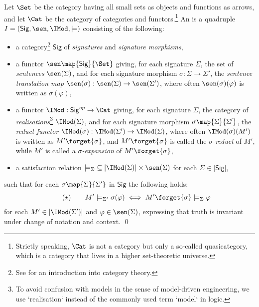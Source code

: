 \documentclass[10pt, a4paper]{isov2}
\newcommand{\Sig}{\mathsf{Sig}}
\begin{document}
\begin{definition}\label{def:inst}  Let $\Set$ be the
category having all small \textsc{}sets as objects and functions as
arrows, and let $\Cat$ be the category
of categories and functors.\footnote {Strictly speaking, $\Cat$ is not a
category but only a so-called quasicategory, which is a category that
lives in a higher set-theoretic universe.}
An
 \cite{GoguenBurstall92} is a quadruple $I=(\Sig,\sen,\IMod,{\models})$
consisting of the following:
%
\begin{itemize}
\item a category\footnote{See \cite{AHS}\cite{MacLane} for an introduction into category theory.} $\Sig$ of \emph{signatures} and \emph{signature morphisms},
\item a functor $\sen\map{\Sig}{\Set}$  giving, for each signature $\Sigma$, the set of
\emph{sentences} $\sen(\Sigma)$, and for each signature morphism
$\sigma:{\Sigma}\to{\Sigma'}$, the \emph{sentence translation map}
$\sen(\sigma):{\sen(\Sigma)}\to{\sen(\Sigma')}$, where often
$\sen(\sigma)(\varphi)$ is written as $\sigma(\varphi)$, \item a
functor $\IMod:{\Sig^{op}}\to{\Cat}$ giving, for each signature
$\Sigma$, the category of \emph{realisations}\footnote{To avoid confusion 
with models in the sense of model-driven engineering, we use `realisation` instead of  the commonly used term `model` in logic.} $\IMod(\Sigma)$, and for each
signature morphism $\sigma\map{\Sigma}{\Sigma'}$, the \emph{reduct
functor\/} $\IMod(\sigma):{\IMod(\Sigma')}\to {\IMod(\Sigma)}$, where
often $\IMod(\sigma)(M')$ is written as $M'\forget{\sigma}$, and
$M'\forget{\sigma}$ is called the \emph{$\sigma$-reduct} of $M'$,
while $M'$ is called a \emph{$\sigma$-expansion} of
$M'\forget{\sigma}$,
\item a satisfaction relation
${\models_{\Sigma}}\subseteq|{\IMod(\Sigma)|\times\sen(\Sigma)}$ for
each $\Sigma\in |\Sig|$,
\end{itemize}
%
such that for each $\sigma\map{\Sigma}{\Sigma'}$ in $\Sig$ the following  holds:
%
\begin{equation}
\tag{$\star$} \qquad M'\models_{\Sigma'}\sigma(\varphi) \iff
M'\forget{\sigma} \models_{\Sigma} \varphi
\end{equation}
%
for each $M'\in |\IMod(\Sigma')|$ and $\varphi\in \sen(\Sigma)$,
expressing that truth is invariant under change of notation and
context.  \qed
\end{definition}
\end{document}
